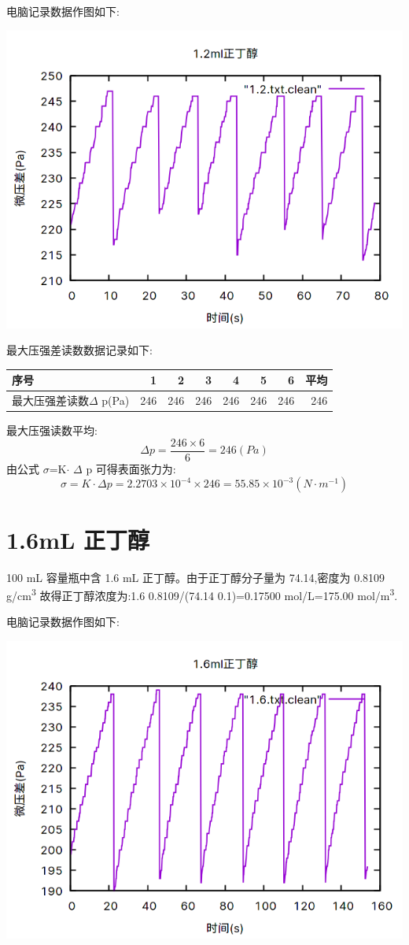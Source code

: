 \documentclass[11pt]{report}
\begin{document}
电脑记录数据作图如下:
\begin{center}
\includegraphics[width=.9\linewidth]{../img/1.2.png}
\end{center}

最大压强差读数数据记录如下:
\begin{center}
\begin{tabular}{lrrrrrrr}
序号 & 1 & 2 & 3 & 4 & 5 & 6 & 平均\\
\hline
最大压强差读数\(\Delta\) p(Pa) & 246 & 246 & 246 & 246 & 246 & 246 & 246\\
\end{tabular}
\end{center}

最大压强读数平均:
\[
    \Delta p =\frac{246\times 6}{6}=246(Pa)
    \]
由公式 \(\sigma\)=K\(\cdot\) \(\Delta\) p 可得表面张力为:
\[
    \sigma=K\cdot \Delta p=2.2703\times 10^{-4}\times 246=55.85\times 10^{-3}(N\cdot m^{-1})
    \]

\section{1.6mL 正丁醇}
\label{sec:org854dd1f}
    100 mL 容量瓶中含 1.6 mL 正丁醇。由于正丁醇分子量为 74.14,密度为 0.8109 g/cm\textsuperscript{3}
故得正丁醇浓度为:1.6\texttimes{} 0.8109/(74.14\texttimes{} 0.1)=0.17500 mol/L=175.00 mol/m\textsuperscript{3}.

电脑记录数据作图如下:
\begin{center}
\includegraphics[width=.9\linewidth]{../img/1.6.png}
\end{center}
\end{document}
